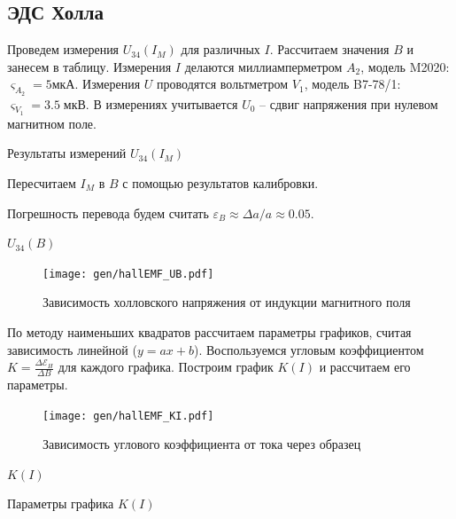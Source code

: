 \documentclass[12pt,a4paper]{article}
\begin{document}
	\subsection*{ЭДС Холла}

	Проведем измерения $U_{34}(I_M)$ для различных $I$. Рассчитаем значения $B$ и занесем в таблицу.
	Измерения $I$ делаются миллиамперметром $A_2$, модель M2020: $\varsigma_{A_2} = 5 мкА $.
	Измерения $U$ проводятся вольтметром $V_1$, модель B7-78/1: $\varsigma_{V_1} = 3.5 \; \text{мкВ}$.
	В измерениях учитывается $U_0$ -- сдвиг напряжения при нулевом магнитном поле.
	\begin{table}[H]
		\addtolength{\tabcolsep}{-4pt}
		\footnotesize
		
		\caption{Результаты измерений $U_{34}(I_M)$}
	\end{table}
	
	Пересчитаем $I_M$ в $B$ с помощью результатов калибровки.
	
	Погрешность перевода будем считать $\varepsilon_B \approx \Delta a / a \approx 0.05$.
	
	\begin{table}[H]
		\addtolength{\tabcolsep}{-4pt}
		\footnotesize
		
		\caption{$U_{34}(B)$}
	\end{table}
		
	\begin{figure}[H]
		\texttt{[image: gen/hallEMF\_UB.pdf]}
		\caption{Зависимость холловского напряжения от индукции магнитного поля}
	\end{figure}

	По методу наименьших квадратов рассчитаем параметры графиков, считая зависимость линейной ($y = ax + b$). Воспользуемся угловым коэффициентом $K = \frac{\Delta \mathcal{E}_H}{\Delta B}$ для каждого графика. Построим график $K(I)$ и рассчитаем его параметры.
	
	\begin{figure}[H]
		\texttt{[image: gen/hallEMF\_KI.pdf]}
		\caption{Зависимость углового коэффициента от тока через образец}
	\end{figure}
	
	\begin{table}[h]
		\caption{$K(I)$}
		
	\end{table}
	
	\begin{table}[h]
		\caption{Параметры графика $K(I)$}
		
	\end{table}
\end{document}
